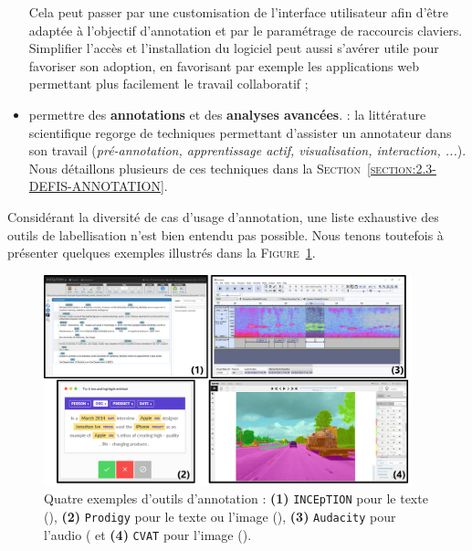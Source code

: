 \begin{itemize}
				Cela peut passer par une customisation de l'interface utilisateur afin d'être adaptée à l'objectif d'annotation et par le paramétrage de raccourcis claviers.
				Simplifier l'accès et l'installation du logiciel peut aussi s'avérer utile pour favoriser son adoption, en favorisant par exemple les applications web permettant plus facilement le travail collaboratif ;
			\item permettre des \textbf{annotations} et des \textbf{analyses avancées}. :
				la littérature scientifique regorge de techniques permettant d'assister un annotateur dans son travail (\textit{pré-annotation, apprentissage actif, visualisation, interaction, ...}).
				Nous détaillons plusieurs de ces techniques dans la \textsc{Section~\ref{section:2.3-DEFIS-ANNOTATION}}.
		\end{itemize}
		
		Considérant la diversité de cas d'usage d'annotation, une liste exhaustive des outils de labellisation n'est bien entendu pas possible.
		Nous tenons toutefois à présenter quelques exemples illustrés dans la \textsc{Figure~\ref{figure:2.2.3-ORGANISATION-ANNOTATION-LOGICIELS}}.
		\begin{figure}[!htb]
			\centering
			\includegraphics[width=0.95\textwidth]{figures/etatdelart-logiciel-exemples}
			\caption{
				Quatre exemples d'outils d'annotation :
				\textbf{(1)} \texttt{INCEpTION} pour le texte (\cite{klie-etal:2018:inception-platform-machineassisted}),
				\textbf{(2)} \texttt{Prodigy} pour le texte ou l'image (\cite{montani-honnibal:2017:prodigy-modern-scriptable}),
				\textbf{(3)} \texttt{Audacity} pour l'audio (\cite{audacity-team:2000:audacity-free-audio}
				et \textbf{(4)} \texttt{CVAT} pour l'image (\cite{cvat.ai-corporation:2019:computer-vision-annotation}).
			}
			\label{figure:2.2.3-ORGANISATION-ANNOTATION-LOGICIELS}
		\end{figure}
		
